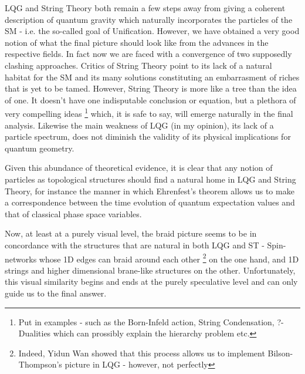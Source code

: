 \documentclass[11pt,english,rmp]{revtex4}
\begin{document}
LQG and String Theory both remain a few steps away from giving a coherent
description of quantum gravity which naturally incorporates the particles
of the SM - i.e. the so-called goal of \textquotedbl{}Unification\textquotedbl{}.
However, we have obtained a very good notion of what the final picture
should look like from the advances in the respective fields. In fact
now we are faced with a convergence of two supposedly clashing approaches.
Critics of String Theory point to its lack of a natural habitat for
the SM and its many solutions constituting an embarrasment of riches
that is yet to be tamed. However, String Theory is more like a tree
than the idea of one. It doesn't have one indisputable conclusion
or equation, but a plethora of very compelling ideas%
\footnote{Put in examples - such as the Born-Infeld action, String Condensation,
?-Dualities which can prossibly explain the hierarchy problem etc.%
} which, it is safe to say, will emerge naturally in the final analysis.
Likewise the main weakness of LQG (in my opinion), its lack of a particle
spectrum, does not diminish the validity of its physical implications
for quantum geometry.

Given this abundance of theoretical evidence, it is clear that any
notion of particles as topological structures should find a natural
home in LQG and String Theory, for instance the manner in which Ehrenfest's
theorem allows us to make a correspondence between the time evolution
of quantum expectation values and that of classical phase space variables.

Now, at least at a purely visual level, the braid picture seems to
be in concordance with the structures that are natural in both LQG
and ST - Spin-networks whose 1D edges can braid around each other%
\footnote{Indeed, Yidun Wan showed that this process allows us to implement
Bilson-Thompson's picture in LQG - however, not perfectly%
} on the one hand, and 1D strings and higher dimensional brane-like
structures on the other. Unfortunately, this visual similarity begins
and ends at the purely speculative level and can only guide us to
the final answer.

\end{document}
